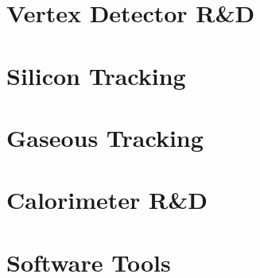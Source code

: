 \documentclass[10pt,final]{report}
\begin{document}
\tableofcontents
\listoftodos
\chapter{Vertex Detector R\&D}








\newpage


\newpage
\chapter{Silicon Tracking}



\chapter{Gaseous Tracking}


\chapter{Calorimeter R\&D}












\chapter{Software Tools}




\printbibliography
\end{document}
